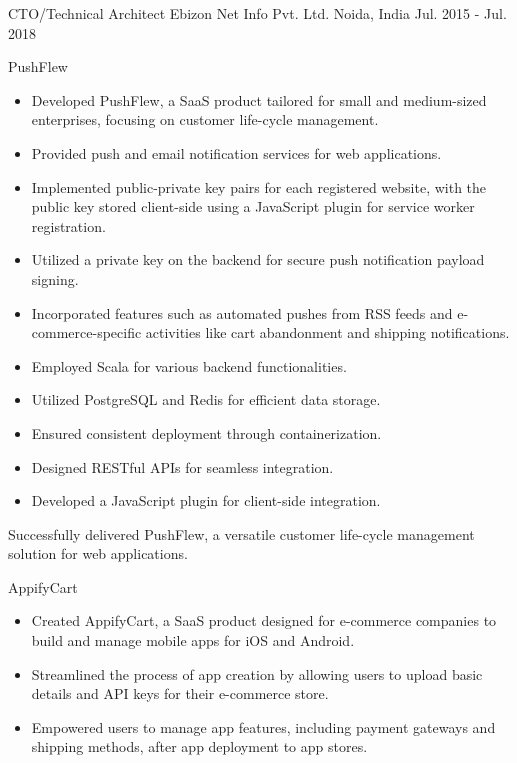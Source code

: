 \begin{cventries}
  \cventry
    {CTO/Technical Architect} %
    {Ebizon Net Info Pvt. Ltd.} %
    {Noida, India} %
    {Jul. 2015 - Jul. 2018} %
    {
      \begin{cvitems} %
        \item{PushFlew}
        \begin{itemize}
        \item Developed PushFlew, a SaaS product tailored for small and medium-sized enterprises, focusing on customer life-cycle management.
        \item Provided push and email notification services for web applications.
        \item Implemented public-private key pairs for each registered website, with the public key stored client-side using a JavaScript plugin for service worker registration.
        \item Utilized a private key on the backend for secure push notification payload signing.
        \item Incorporated features such as automated pushes from RSS feeds and e-commerce-specific activities like cart abandonment and shipping notifications.
        \item Employed Scala for various backend functionalities.
        \item Utilized PostgreSQL and Redis for efficient data storage.
        \item Ensured consistent deployment through containerization.
        \item Designed RESTful APIs for seamless integration.
        \item Developed a JavaScript plugin for client-side integration.
      \end{itemize}
        Successfully delivered PushFlew, a versatile customer life-cycle management solution for web applications.
        \item{AppifyCart}
        \begin{itemize}
          \item Created AppifyCart, a SaaS product designed for e-commerce companies to build and manage mobile apps for iOS and Android.
          \item Streamlined the process of app creation by allowing users to upload basic details and API keys for their e-commerce store.
          \item Empowered users to manage app features, including payment gateways and shipping methods, after app deployment to app stores.

\end{itemize}
\end{cvitems}}
\end{cventries}
